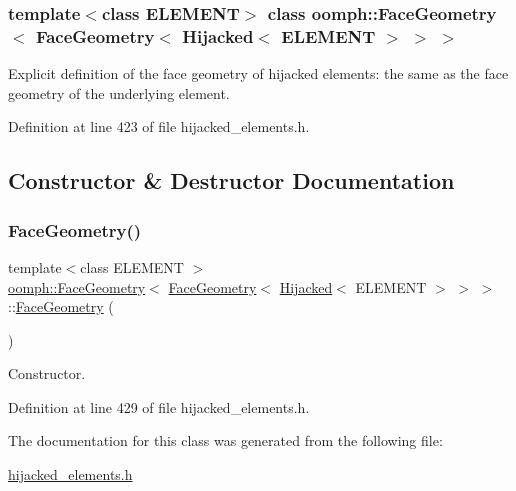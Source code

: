 \subsubsection*{template$<$class E\+L\+E\+M\+E\+NT$>$\newline
class oomph\+::\+Face\+Geometry$<$ Face\+Geometry$<$ Hijacked$<$ E\+L\+E\+M\+E\+N\+T $>$ $>$ $>$}

Explicit definition of the face geometry of hijacked elements\+: the same as the face geometry of the underlying element. 

Definition at line 423 of file hijacked\+\_\+elements.\+h.



\subsection{Constructor \& Destructor Documentation}
\mbox{\label{classoomph_1_1FaceGeometry_3_01FaceGeometry_3_01Hijacked_3_01ELEMENT_01_4_01_4_01_4_aeef3807dfeeb7259e2ff63b94c43181a}} 
\subsubsection{\texorpdfstring{Face\+Geometry()}{FaceGeometry()}}
{\footnotesize\ttfamily template$<$class E\+L\+E\+M\+E\+NT $>$ \\
\hyperlink{classoomph_1_1FaceGeometry}{oomph\+::\+Face\+Geometry}$<$ \hyperlink{classoomph_1_1FaceGeometry}{Face\+Geometry}$<$ \hyperlink{classoomph_1_1Hijacked}{Hijacked}$<$ E\+L\+E\+M\+E\+NT $>$ $>$ $>$\+::\hyperlink{classoomph_1_1FaceGeometry}{Face\+Geometry} (\begin{DoxyParamCaption}{ }\end{DoxyParamCaption})\hspace{0.3cm}{\ttfamily [inline]}}



Constructor. 



Definition at line 429 of file hijacked\+\_\+elements.\+h.



The documentation for this class was generated from the following file\+:\begin{DoxyCompactItemize}
\item 
\hyperlink{hijacked__elements_8h}{hijacked\+\_\+elements.\+h}\end{DoxyCompactItemize}
